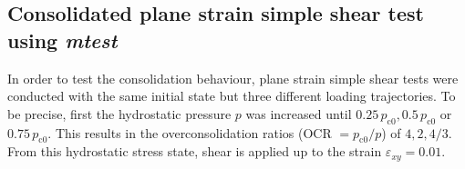\documentclass[paper=a4, twoside, pagesize]{scrartcl}
\renewcommand{\c}{\text{c}}
\begin{document}
\subsection{Consolidated plane strain simple shear test using \textsl{mtest}}\label{subsec:mtestResults}

In order to test the consolidation behaviour, plane strain simple shear tests were conducted with the same initial state but three different loading trajectories. To be precise, first the hydrostatic pressure $p$ was increased until $0.25\,p_{\c0}, 0.5\,p_{\c0}$ or $0.75\,p_{\c0}$. This results in the overconsolidation ratios (OCR $=p_{\c0}/p$) of $4, 2, 4/3$. From this hydrostatic stress state, shear is applied up to the strain $\varepsilon_{xy}=0.01$.

\end{document}
